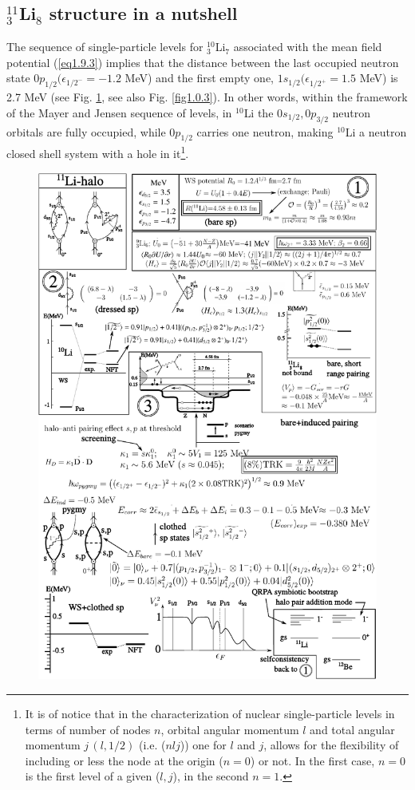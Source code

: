 \subsection{$^{11}_3$Li$_8$ structure in a nutshell}\label{S1.9.3}
The sequence of single-particle levels for  $^{10}_3$Li$_7$ associated with the mean field potential (\ref{eq1.9.3}) implies that the distance between the last occupied neutron state $0p_{1/2}(\epsilon_{1/2^-}=-1.2$ MeV) and  the first empty one, $1s_{1/2}(\epsilon_{1/2^+}=1.5$ MeV) is 2.7 MeV (see Fig. \ref{fig1.9.1}, see also Fig. \ref{fig1.0.3}). In other words, within the framework of the Mayer and Jensen sequence of levels, in $^{10}$Li the $0s_{1/2},0p_{3/2}$ neutron orbitals are fully occupied, while $0p_{1/2}$ carries one neutron, making $^{10}$Li a neutron closed shell system with a hole in it\footnote{It is of notice that in the characterization of nuclear single-particle levels in terms of number of nodes $n$, orbital angular momentum $l$ and total angular momentum $j\,(l,1/2)$ (i.e. ($nlj$)) one for $l$ and $j$, allows for the flexibility of including or less the node at the origin ($n=0$) or not. In the first case, $n=0$ is the first level of a given ($l,j$), in the second $n=1$.}.
     \begin{figure}
     \centerline {
     \includegraphics*[width=16cm]{introduccion/figs/fig1_9_1}
     }
     \caption{}
     \label{fig1.9.1}
     \end{figure}
 
